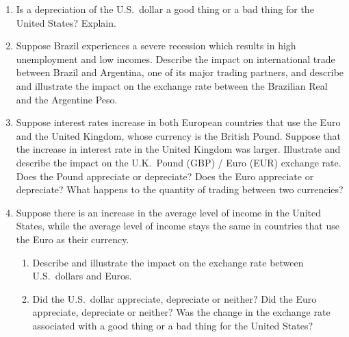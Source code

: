 \documentclass[
    letterpaper,paper=portrait,fleqn,
    DIV=16,fontsize=12pt,twoside=semi,
    parskip=full-,
    headings=standardclasses]
{scrartcl}
\begin{document}
\begin{enumerate}

\item Is a depreciation of the U.S.~dollar a good thing or a bad thing for the United States? Explain.

\vspace{5.0\baselineskip}

\item Suppose Brazil experiences a severe recession which results in high unemployment and low incomes.
Describe the impact on international trade between Brazil and Argentina, one of its major trading
partners, and describe and illustrate the impact on the exchange rate between the Brazilian Real and
the Argentine Peso.

\vfill

\clearpage

\item Suppose interest rates increase in both European countries that use the Euro and the United Kingdom,
whose currency is the British Pound. Suppose that the increase in interest rate in the United Kingdom
was larger. Illustrate and describe the impact on the U.K.~Pound (GBP) / Euro (EUR) exchange rate.
Does the Pound appreciate or depreciate? Does the Euro appreciate or depreciate? What happens
to the quantity of trading between two currencies?

\vfill

\item Suppose there is an increase in the average level of income in the United States, while the average
level of income stays the same in countries that use the Euro as their currency.

\begin{enumerate}

\item Describe and illustrate the impact on the exchange rate between U.S.~dollars and Euros.

\vfill

\item Did the U.S.~dollar appreciate, depreciate or neither? Did the Euro appreciate, depreciate or
neither? Was the change in the exchange rate associated with a good thing or a bad thing for
the United States?

\vspace{3.0\baselineskip}

\end{enumerate}

\clearpage


\end{enumerate}
\end{document}
